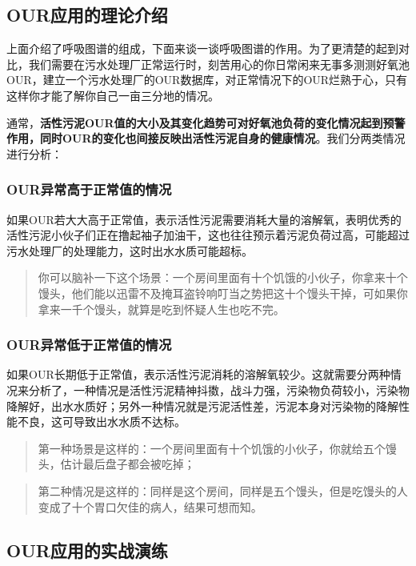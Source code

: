 \documentclass[]{book}
\begin{document}
\subsection{OUR应用的理论介绍}\label{our}

上面介绍了呼吸图谱的组成，下面来谈一谈呼吸图谱的作用。为了更清楚的起到对比，我们需要在污水处理厂正常运行时，刻苦用心的你日常闲来无事多测测好氧池OUR，建立一个污水处理厂的OUR数据库，对正常情况下的OUR烂熟于心，只有这样你才能了解你自己一亩三分地的情况。

通常，\textbf{活性污泥OUR值的大小及其变化趋势可对好氧池负荷的变化情况起到预警作用，同时OUR的变化也间接反映出活性污泥自身的健康情况}。我们分两类情况进行分析：

\subsubsection{OUR异常高于正常值的情况}\label{our}

如果OUR若大大高于正常值，表示活性污泥需要消耗大量的溶解氧，表明优秀的活性污泥小伙子们正在撸起袖子加油干，这也往往预示着污泥负荷过高，可能超过污水处理厂的处理能力，这时出水水质可能超标。

\begin{quote}
你可以脑补一下这个场景：一个房间里面有十个饥饿的小伙子，你拿来十个馒头，他们能以迅雷不及掩耳盗铃响叮当之势把这十个馒头干掉，可如果你拿来一千个馒头，就算是吃到怀疑人生也吃不完。
\end{quote}

\subsubsection{OUR异常低于正常值的情况}\label{our}

如果OUR长期低于正常值，表示活性污泥消耗的溶解氧较少。这就需要分两种情况来分析了，一种情况是活性污泥精神抖擞，战斗力强，污染物负荷较小，污染物降解好，出水水质好；另外一种情况就是污泥活性差，污泥本身对污染物的降解性能不良，这可导致出水水质不达标。

\begin{quote}
第一种场景是这样的：一个房间里面有十个饥饿的小伙子，你就给五个馒头，估计最后盘子都会被吃掉；
\end{quote}

\begin{quote}
第二种情况是这样的：同样是这个房间，同样是五个馒头，但是吃馒头的人变成了十个胃口欠佳的病人，结果可想而知。
\end{quote}

\subsection{OUR应用的实战演练}\label{our}
\end{document}
